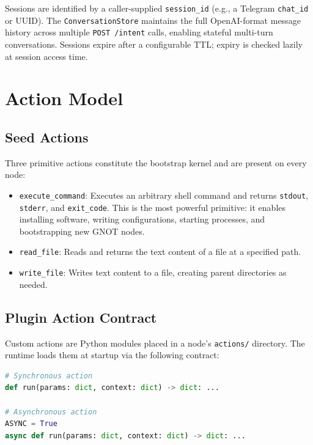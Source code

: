 \documentclass[10pt,twocolumn]{article}
\begin{document}
Sessions are identified by a caller-supplied \texttt{session\_id}
(e.g., a Telegram \texttt{chat\_id} or UUID). The
\texttt{ConversationStore} maintains the full OpenAI-format message
history across multiple \texttt{POST /intent} calls, enabling stateful
multi-turn conversations. Sessions expire after a configurable TTL;
expiry is checked lazily at session access time.

\section{Action Model}
\label{sec:actions}

\subsection{Seed Actions}

Three primitive actions constitute the bootstrap kernel and are present
on every node:

\begin{itemize}[noitemsep, leftmargin=12pt]
  \item \texttt{execute\_command}: Executes an arbitrary shell command
    and returns \texttt{stdout}, \texttt{stderr}, and \texttt{exit\_code}.
    This is the most powerful primitive: it enables installing software,
    writing configurations, starting processes, and bootstrapping new
    GNOT nodes.
  \item \texttt{read\_file}: Reads and returns the text content of a
    file at a specified path.
  \item \texttt{write\_file}: Writes text content to a file, creating
    parent directories as needed.
\end{itemize}

\subsection{Plugin Action Contract}

Custom actions are Python modules placed in a node's \texttt{actions/}
directory. The runtime loads them at startup via the following contract:

\begin{lstlisting}[language=python, caption={Plugin action contract}]
# Synchronous action
def run(params: dict, context: dict) -> dict: ...

# Asynchronous action
ASYNC = True
async def run(params: dict, context: dict) -> dict: ...
\end{lstlisting}
\end{document}
